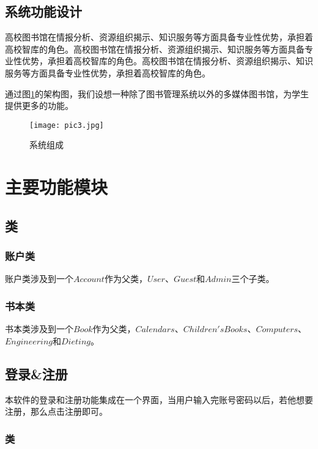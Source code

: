 \documentclass[forprint]{shmtu}
\begin{document}
\section{系统功能设计}
高校图书馆在情报分析、资源组织揭示、知识服务等方面具备专业性优势，承担着高校智库的角色。高校图书馆在情报分析、资源组织揭示、知识服务等方面具备专业性优势，承担着高校智库的角色。高校图书馆在情报分析、资源组织揭示、知识服务等方面具备专业性优势，承担着高校智库的角色。

通过图\ref{pic:3}的架构图，我们设想一种除了图书管理系统以外的多媒体图书馆，为学生提供更多的功能。

\begin{figure}[!htbp]
	\centering
	\texttt{[image: pic3.jpg]}
	\caption{系统组成}
	\label{pic:3}
\end{figure}

\chapter{主要功能模块}

\section{类}

\subsection{账户类}

账户类涉及到一个$ Account $作为父类，$ User $、$ Guest $和$ Admin $三个子类。

\subsection{书本类}

书本类涉及到一个$ Book $作为父类，$Calendars$、$Children's Books$、$Computers$、$Engineering$和$Dieting$。

\section{登录\&注册}

本软件的登录和注册功能集成在一个界面，当用户输入完账号密码以后，若他想要注册，那么点击注册即可。

\subsection{类}
\end{document}
